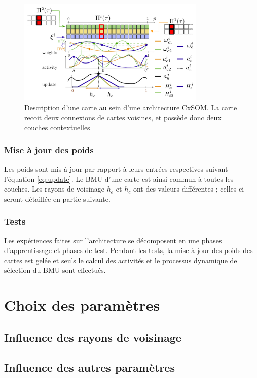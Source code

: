 \begin{figure}
\centering
\includegraphics[width=0.8\textwidth]{one_map.pdf}
\caption{Description d'une carte au sein d'une architecture CxSOM. La carte recoit deux connexions de cartes voisines, et possède donc deux couches contextuelles}
\label{fig:one_map}
\end{figure}

\subsubsection{Mise à jour des poids}

Les poids sont mis à jour par rapport à leurs entrées respectives suivant l'équation \ref{eq:update}. Le BMU d'une carte est ainsi commun à toutes les couches. Les rayons de voisinage $h_e$ et $h_c$ ont des valeurs différentes ; celles-ci seront détaillée en partie suivante. 

\subsubsection{Tests}

Les expériences faites sur l'architecture se décomposent en une phases d'apprentissage et phases de test. Pendant les tests, la mise à jour des poids des cartes est gelée et seuls le calcul des activités et le processus dynamique de sélection du BMU sont effectués.

\section{Choix des paramètres}

\subsection{Influence des rayons de voisinage}

\subsection{Influence des autres paramètres}

